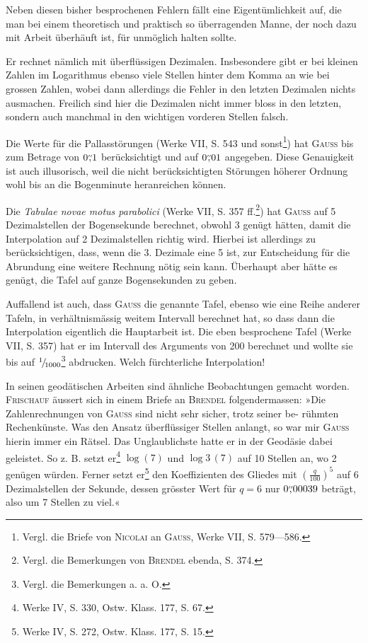 Neben diesen bisher besprochenen Fehlern fällt eine Eigentümlichkeit
auf, die man bei einem theoretisch und praktisch so überragenden Manne,
der noch dazu mit Arbeit überhäuft ist, für unmöglich halten sollte.

Er rechnet nämlich mit überflüssigen Dezimalen. Insbesondere gibt er
bei kleinen Zahlen im Logarithmus ebenso viele Stellen hinter dem Komma
an wie bei grossen Zahlen, wobei dann allerdings die Fehler in den letzten
Dezimalen nichts ausmachen. Freilich sind hier die Dezimalen nicht immer
bloss in den letzten, sondern auch manchmal in den wichtigen vorderen Stellen
falsch.

Die Werte für die Pallasstörungen (Werke VII, S. 543 und sonst\footnote{Vergl. die Briefe von \textsc{Nicolai} an \textsc{Gauss}, Werke VII, S. 579—586.}) hat
\textsc{Gauss} bis zum Betrage von $0\mathord{\overset{\scriptscriptstyle\prime\prime}{,}}1$ berücksichtigt und auf $0\mathord{\overset{\scriptscriptstyle\prime\prime}{,}}01$ angegeben. Diese
Genauigkeit ist auch illusorisch, weil die nicht berücksichtigten Störungen
höherer Ordnung wohl bis an die Bogenminute heranreichen können.

Die \textit{Tabulae novae motus parabolici} (Werke VII, S. 357 ff.\footnote{Vergl. die Bemerkungen von \textsc{Brendel} ebenda, S. 374.}) hat \textsc{Gauss} auf
5 Dezimalstellen der Bogensekunde berechnet, obwohl 3 genügt hätten, damit
die Interpolation auf 2 Dezimalstellen richtig wird. Hierbei ist allerdings zu
berücksichtigen, dass, wenn die 3. Dezimale eine 5 ist, zur Entscheidung für
die Abrundung eine weitere Rechnung nötig sein kann. Überhaupt aber
hätte es genügt, die Tafel auf ganze Bogensekunden zu geben.

Auffallend ist auch, dass \textsc{Gauss} die genannte Tafel, ebenso wie eine Reihe
anderer Tafeln, in verhältnismässig weitem Intervall berechnet hat, so dass
dann die Interpolation eigentlich die Hauptarbeit ist. Die eben besprochene
Tafel (Werke VII, S. 357) hat er im Intervall des Arguments von 200 berechnet
und wollte sie bis auf $\relax{}^{1}\!/\!_{1000}$\footnote{Vergl. die Bemerkungen a. a. O.} abdrucken. Welch fürchterliche Interpolation!

In seinen geodätischen Arbeiten sind ähnliche Beobachtungen gemacht
worden. \textsc{Frischauf} äussert sich in einem Briefe an \textsc{Brendel} folgendermassen:
»Die Zahlenrechnungen von \textsc{Gauss} sind nicht sehr sicher, trotz seiner be-
\clearpage{}
\setcounter{footnote}{0}
\noindent rühmten Rechenkünste. Was den Ansatz überflüssiger Stellen anlangt, so war
mir \textsc{Gauss} hierin immer ein Rätsel. Das Unglaublichste hatte er in der Geodäsie dabei geleistet. So z. B. setzt er\footnote{Werke IV, S. 330, Ostw. Klass. 177, S. 67.} $\log(7)$ und $\log 3\,(7)$ auf 10 Stellen
an, wo 2 genügen würden. Ferner setzt er\footnote{Werke IV, S. 272, Ostw. Klass. 177, S. 15.} den Koeffizienten des Gliedes
mit $\left(\frac{q}{100}\right)^5$ auf 6 Dezimalstellen der Sekunde, dessen grösster Wert für $q=6$
nur $0\mathord{\overset{\scriptscriptstyle\prime\prime}{,}}00039$ beträgt, also um 7 Stellen zu viel.«

